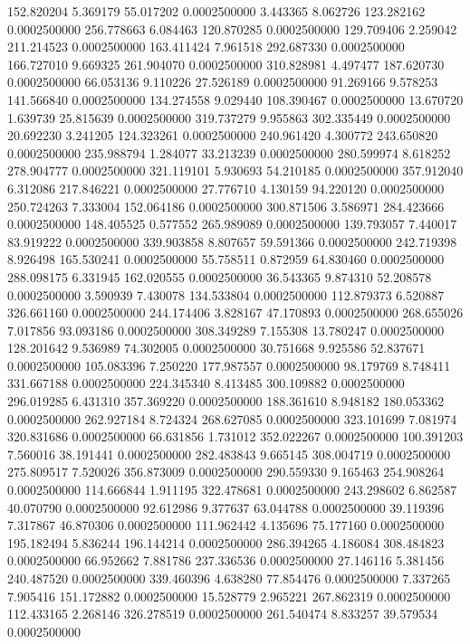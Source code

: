 152.820204 5.369179 55.017202 0.0002500000
3.443365 8.062726 123.282162 0.0002500000
256.778663 6.084463 120.870285 0.0002500000
129.709406 2.259042 211.214523 0.0002500000
163.411424 7.961518 292.687330 0.0002500000
166.727010 9.669325 261.904070 0.0002500000
310.828981 4.497477 187.620730 0.0002500000
66.053136 9.110226 27.526189 0.0002500000
91.269166 9.578253 141.566840 0.0002500000
134.274558 9.029440 108.390467 0.0002500000
13.670720 1.639739 25.815639 0.0002500000
319.737279 9.955863 302.335449 0.0002500000
20.692230 3.241205 124.323261 0.0002500000
240.961420 4.300772 243.650820 0.0002500000
235.988794 1.284077 33.213239 0.0002500000
280.599974 8.618252 278.904777 0.0002500000
321.119101 5.930693 54.210185 0.0002500000
357.912040 6.312086 217.846221 0.0002500000
27.776710 4.130159 94.220120 0.0002500000
250.724263 7.333004 152.064186 0.0002500000
300.871506 3.586971 284.423666 0.0002500000
148.405525 0.577552 265.989089 0.0002500000
139.793057 7.440017 83.919222 0.0002500000
339.903858 8.807657 59.591366 0.0002500000
242.719398 8.926498 165.530241 0.0002500000
55.758511 0.872959 64.830460 0.0002500000
288.098175 6.331945 162.020555 0.0002500000
36.543365 9.874310 52.208578 0.0002500000
3.590939 7.430078 134.533804 0.0002500000
112.879373 6.520887 326.661160 0.0002500000
244.174406 3.828167 47.170893 0.0002500000
268.655026 7.017856 93.093186 0.0002500000
308.349289 7.155308 13.780247 0.0002500000
128.201642 9.536989 74.302005 0.0002500000
30.751668 9.925586 52.837671 0.0002500000
105.083396 7.250220 177.987557 0.0002500000
98.179769 8.748411 331.667188 0.0002500000
224.345340 8.413485 300.109882 0.0002500000
296.019285 6.431310 357.369220 0.0002500000
188.361610 8.948182 180.053362 0.0002500000
262.927184 8.724324 268.627085 0.0002500000
323.101699 7.081974 320.831686 0.0002500000
66.631856 1.731012 352.022267 0.0002500000
100.391203 7.560016 38.191441 0.0002500000
282.483843 9.665145 308.004719 0.0002500000
275.809517 7.520026 356.873009 0.0002500000
290.559330 9.165463 254.908264 0.0002500000
114.666844 1.911195 322.478681 0.0002500000
243.298602 6.862587 40.070790 0.0002500000
92.612986 9.377637 63.044788 0.0002500000
39.119396 7.317867 46.870306 0.0002500000
111.962442 4.135696 75.177160 0.0002500000
195.182494 5.836244 196.144214 0.0002500000
286.394265 4.186084 308.484823 0.0002500000
66.952662 7.881786 237.336536 0.0002500000
27.146116 5.381456 240.487520 0.0002500000
339.460396 4.638280 77.854476 0.0002500000
7.337265 7.905416 151.172882 0.0002500000
15.528779 2.965221 267.862319 0.0002500000
112.433165 2.268146 326.278519 0.0002500000
261.540474 8.833257 39.579534 0.0002500000
